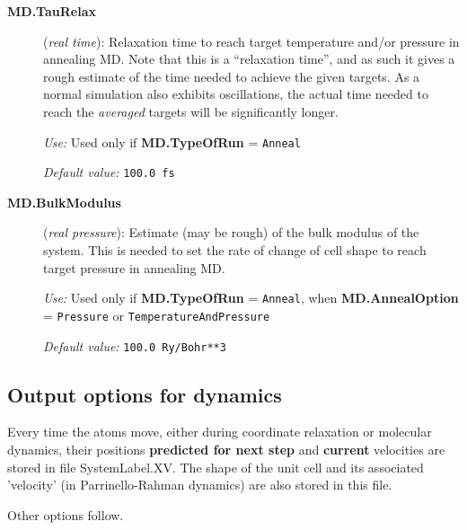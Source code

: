 \documentclass[11pt]{article}
\begin{document}
\begin{description}
\item[{\bf MD.TauRelax}] ({\it real time}):  Relaxation time to reach target temperature and/or
  pressure in annealing MD. Note that this is a ``relaxation time'',
  and as such it gives a rough estimate of the time needed to achieve
  the given targets. As a normal simulation also exhibits
  oscillations, the actual time needed to reach the {\it averaged}
  targets will be significantly longer.

{\it Use:} Used only if {\bf MD.TypeOfRun} = {\tt Anneal}

{\it Default value:} {\tt 100.0 fs}

\item[{\bf MD.BulkModulus}] ({\it real pressure}):
   Estimate (may be rough)
  of the bulk modulus of the system.  This is needed to set the rate
  of change of cell shape to reach target pressure in annealing MD.

{\it Use:} Used only if {\bf MD.TypeOfRun} = {\tt Anneal}, when
{\bf MD.AnnealOption} = {\tt Pressure} or {\tt TemperatureAndPressure}

{\it Default value:}  {\tt 100.0 Ry/Bohr**3}


\end{description}

\subsection{Output options for dynamics}

Every time the atoms move, either during coordinate relaxation or
molecular dynamics, their positions {\bf predicted for next step} and
{\bf current} velocities are stored in file SystemLabel.XV. The shape
of the unit cell and its associated 'velocity' (in Parrinello-Rahman
dynamics) are also stored in this file.

Other options follow.
\end{document}
